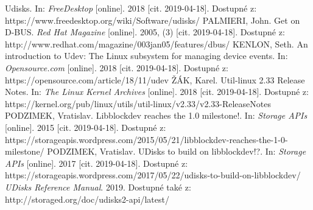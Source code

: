 \documentclass[a4paper,12pt]{article}
\begin{document}
{Udisks. In: \textit{FreeDesktop} [online]. 2018 [cit. 2019-04-18]. Dostupné z: https://www.freedesktop.org/wiki/Software/udisks/
PALMIERI, John. Get on D-BUS. \textit{Red Hat Magazine} [online]. 2005, (3) [cit. 2019-04-18]. Dostupné z: http://www.redhat.com/magazine/003jan05/features/dbus/
KENLON, Seth. An introduction to Udev: The Linux subsystem for managing device events. In: \textit{Opensource.com} [online]. 2018 [cit. 2019-04-18]. Dostupné z: https://opensource.com/article/18/11/udev
ŽÁK, Karel. Util-linux 2.33 Release Notes. In: \textit{The Linux Kernel Archives} [online]. 2018 [cit. 2019-04-18]. Dostupné z: https://kernel.org/pub/linux/utils/util-linux/v2.33/v2.33-ReleaseNotes
PODZIMEK, Vratislav. Libblockdev reaches the 1.0 milestone!. In: \textit{Storage APIs} [online]. 2015 [cit. 2019-04-18]. Dostupné z: https://storageapis.wordpress.com/2015/05/21/libblockdev-reaches-the-1-0-milestone/
PODZIMEK, Vratislav. UDisks to build on libblockdev!?. In: \textit{Storage APIs} [online]. 2017 [cit. 2019-04-18]. Dostupné z: https://storageapis.wordpress.com/2017/05/22/udisks-to-build-on-libblockdev/
\textit{UDisks Reference Manual}. 2019. Dostupné také z: http://storaged.org/doc/udisks2-api/latest/
}





\seznamobr  %


\seznamtab  %




\end{document}
